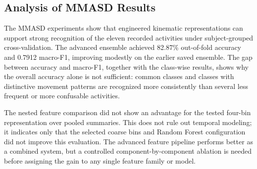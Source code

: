\documentclass[a4paper,12pt]{report}
\begin{document}
%

\subsection*{Analysis of MMASD Results}

The MMASD experiments show that engineered kinematic representations can support strong recognition of the eleven recorded activities under subject-grouped cross-validation. The advanced ensemble achieved 82.87\% out-of-fold accuracy and 0.7912 macro-F1, improving modestly on the earlier saved ensemble. The gap between accuracy and macro-F1, together with the class-wise results, shows why the overall accuracy alone is not sufficient: common classes and classes with distinctive movement patterns are recognized more consistently than several less frequent or more confusable activities.

The nested feature comparison did not show an advantage for the tested four-bin representation over pooled summaries. This does not rule out temporal modeling; it indicates only that the selected coarse bins and Random Forest configuration did not improve this evaluation. The advanced feature pipeline performs better as a combined system, but a controlled component-by-component ablation is needed before assigning the gain to any single feature family or model.
\end{document}
